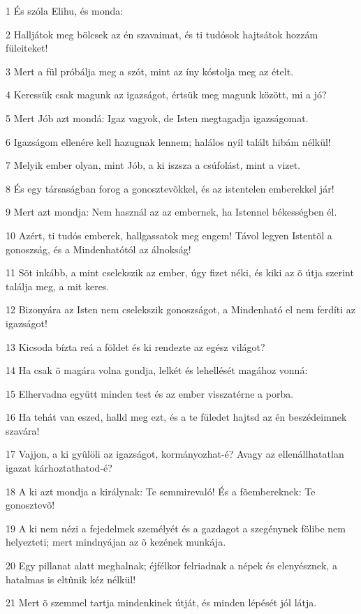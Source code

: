 \par 1 És szóla Elihu, és monda:
\par 2 Halljátok meg bölcsek az én szavaimat, és ti tudósok hajtsátok hozzám füleiteket!
\par 3 Mert a fül próbálja meg a szót, mint az íny kóstolja meg az ételt.
\par 4 Keressük csak magunk az igazságot, értsük meg magunk között, mi a jó?
\par 5 Mert Jób azt mondá: Igaz vagyok, de Isten megtagadja igazságomat.
\par 6 Igazságom ellenére kell hazugnak lennem; halálos nyíl talált hibám nélkül!
\par 7 Melyik ember olyan, mint Jób, a ki iszsza a csúfolást, mint a vizet.
\par 8 És egy társaságban forog a gonosztevõkkel, és az istentelen emberekkel jár!
\par 9 Mert azt mondja: Nem használ az az embernek, ha Istennel békességben él.
\par 10 Azért, ti tudós emberek, hallgassatok meg engem! Távol legyen Istentõl a gonoszság, és a Mindenhatótól az álnokság!
\par 11 Sõt inkább, a mint cselekszik az ember, úgy fizet néki, és kiki az õ útja szerint találja meg, a mit keres.
\par 12 Bizonyára az Isten nem cselekszik gonoszságot, a Mindenható el nem ferdíti az igazságot!
\par 13 Kicsoda bízta reá a földet és ki rendezte az egész világot?
\par 14 Ha csak õ magára volna gondja, lelkét és lehellését magához vonná:
\par 15 Elhervadna együtt minden test és az ember visszatérne a porba.
\par 16 Ha tehát van eszed, halld meg ezt, és a te füledet hajtsd az én beszédeimnek szavára!
\par 17 Vajjon, a ki gyûlöli az igazságot, kormányozhat-é?  Avagy az ellenállhatatlan igazat kárhoztathatod-é?
\par 18 A ki azt mondja a királynak: Te semmirevaló! És a fõembereknek: Te gonosztevõ!
\par 19 A ki nem nézi a fejedelmek személyét és a gazdagot a szegénynek fölibe nem helyezteti; mert mindnyájan az õ  kezének munkája.
\par 20 Egy pillanat alatt meghalnak; éjfélkor felriadnak a népek és elenyésznek, a hatalmas is eltûnik kéz nélkül!
\par 21 Mert õ szemmel tartja mindenkinek útját, és minden lépését jól látja.
